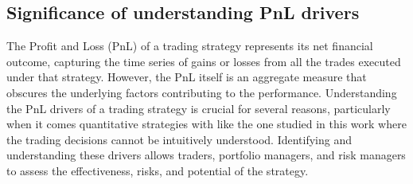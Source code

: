 \subsection{Significance of understanding PnL drivers}
The Profit and Loss (PnL) of a trading strategy represents its net financial outcome, capturing the time series of gains or losses from all the trades executed under that strategy. However, the PnL itself is an aggregate measure that obscures the underlying factors contributing to the performance. Understanding the PnL drivers of a trading strategy is crucial for several reasons, particularly when it comes quantitative strategies with like the one studied in this work where the trading decisions cannot be intuitively understood. Identifying and understanding these drivers allows traders, portfolio managers, and risk managers to assess the effectiveness, risks, and potential of the strategy.

